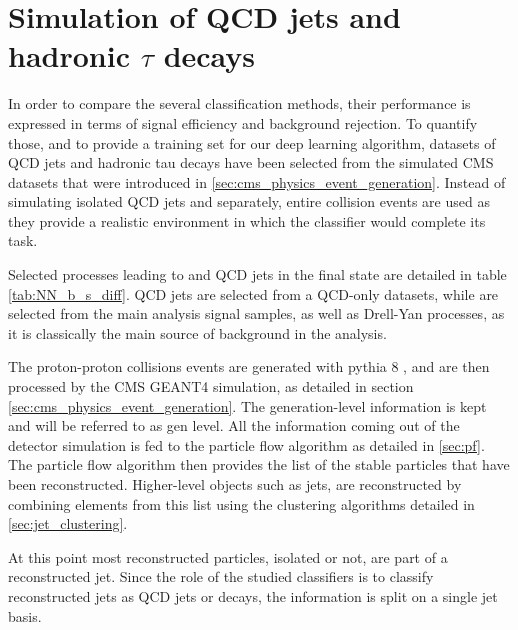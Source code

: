\section{Simulation of QCD jets and hadronic $\tau$ decays}
\label{sec:NN_datasets}

In order to compare the several classification methods, their performance is expressed in terms of signal efficiency and background rejection. To quantify those, and to provide a training set for our deep learning algorithm, datasets of QCD jets and hadronic tau decays have been selected from the simulated CMS datasets that were introduced in \ref{sec:cms_physics_event_generation}. Instead of simulating isolated QCD jets and \tauh separately, entire collision events are used as they provide a realistic environment in which the classifier would complete its task.

Selected processes leading to \tauh and QCD jets in the final state are detailed in table \ref{tab:NN_b_s_diff}. QCD jets are selected from a QCD-only datasets, while \tauh are selected from the main analysis signal samples, as well as Drell-Yan processes, as it is classically the main source of background in the analysis.

The proton-proton collisions events are generated with pythia 8 \cite{pythia}, and are then processed by the CMS GEANT4 simulation, as detailed in section \ref{sec:cms_physics_event_generation}. The generation-level information is kept and will be referred to as gen level. All the information coming out of the detector simulation is fed to the particle flow algorithm as detailed in \ref{sec:pf}.
The particle flow algorithm then provides the list of the stable particles that have been reconstructed. Higher-level objects such as jets, are reconstructed by combining elements from this list using the clustering algorithms detailed in \ref{sec:jet_clustering}.

At this point most reconstructed particles, isolated or not, are part of a reconstructed jet. Since the role of the studied classifiers is to classify reconstructed jets as QCD jets or \tauh decays, the information is split on a single jet basis.

